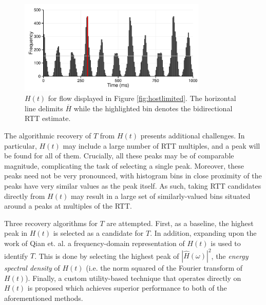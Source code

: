 \begin{figure}
  \centering
  \includegraphics[width=0.8\textwidth]{figures/malawi/rttbin.pdf}
  \caption{$H(t)$ for flow displayed in Figure \ref{fig:hostlimited}. The horizontal line delimits $\overline{H}$ while the highlighted bin denotes the bidirectional RTT estimate.\label{fig:histogram}}
\end{figure}

%
%
The algorithmic recovery of $T$ from $H(t)$ presents additional challenges. 
In particular, $H(t)$ may include a large number of \ac{RTT} multiples, and a peak will be found for all of them. 
Crucially, all these peaks may be of comparable magnitude, complicating the task of selecting a single peak.
Moreover, these peaks need not be very pronounced, with histogram bins in close proximity of the peaks have very similar values as the peak itself. 
As such, taking \ac{RTT} candidates directly from $H(t)$ may result in a large set of similarly-valued bins situated around a peaks at multiples of the \ac{RTT}. 

Three recovery algorithms for $T$ are attempted.
First, as a baseline, the highest peak in $H(t)$ is selected as a candidate for $T$. 
In addition, expanding upon the work of Qian et. al. \cite{Qian:2009p429} a frequency-domain representation of $H(t)$ is used to identify $T$. 
This is done by selecting the highest peak of $|\hat{H}(\omega)|^2$, the \emph{energy spectral density} of $H(t)$ (i.e. the norm squared of the Fourier transform of $H(t)$). 
Finally, a custom utility-based technique that operates directly on $H(t)$ is proposed which achieves superior performance to both of the aforementioned methods.

